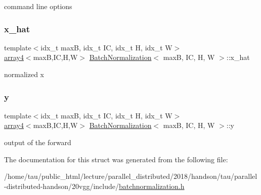 command line options \mbox{\label{structBatchNormalization_ab0962f839e8eed605d7fb43fc2eb979d}} 
\subsubsection{\texorpdfstring{x\+\_\+hat}{x\_hat}}
{\footnotesize\ttfamily template$<$idx\+\_\+t maxB, idx\+\_\+t IC, idx\+\_\+t H, idx\+\_\+t W$>$ \\
\hyperlink{structarray4}{array4}$<$maxB,IC,H,W$>$ \hyperlink{structBatchNormalization}{Batch\+Normalization}$<$ maxB, IC, H, W $>$\+::x\+\_\+hat}

normalized x \mbox{\label{structBatchNormalization_a1453d9955c9cb72c5316c98cb06d1867}} 
\subsubsection{\texorpdfstring{y}{y}}
{\footnotesize\ttfamily template$<$idx\+\_\+t maxB, idx\+\_\+t IC, idx\+\_\+t H, idx\+\_\+t W$>$ \\
\hyperlink{structarray4}{array4}$<$maxB,IC,H,W$>$ \hyperlink{structBatchNormalization}{Batch\+Normalization}$<$ maxB, IC, H, W $>$\+::y}

output of the forward 

The documentation for this struct was generated from the following file\+:\begin{DoxyCompactItemize}
\item 
/home/tau/public\+\_\+html/lecture/parallel\+\_\+distributed/2018/handson/tau/parallel-\/distributed-\/handson/20vgg/include/\hyperlink{batchnormalization_8h}{batchnormalization.\+h}\end{DoxyCompactItemize}

